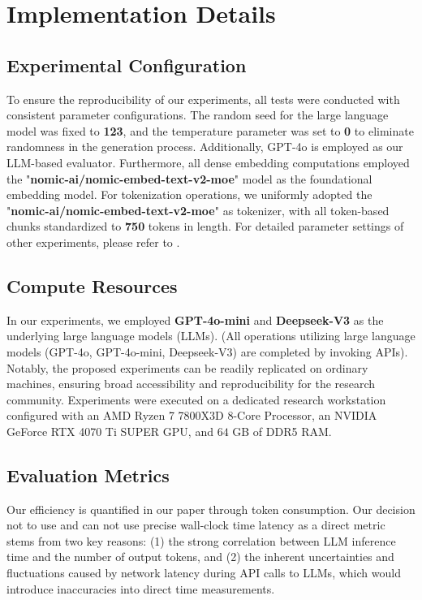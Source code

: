 \section{Implementation Details}
\label{appendix:implementation-details}


\subsection{Experimental Configuration}
\label{appendix:experiment-config}
To ensure the reproducibility of our experiments, all tests were conducted with consistent parameter configurations. The random seed for the large language model was fixed to \textbf{123}, and the temperature parameter was set to \textbf{0} to eliminate randomness in the generation process. Additionally, GPT-4o is employed as our LLM-based evaluator. Furthermore, all dense embedding computations employed the "\textbf{nomic-ai/nomic-embed-text-v2-moe}" model \cite{Chunk4} as the foundational embedding model. For tokenization operations, we uniformly adopted the "\textbf{nomic-ai/nomic-embed-text-v2-moe}" as tokenizer, with all token-based chunks standardized to \textbf{750} tokens in length. For detailed parameter settings of other experiments, please refer to .

\subsection{Compute Resources}
\label{appendix:compute-resources}
In our experiments, we employed \textbf{GPT-4o-mini} \cite{gpt-4o-mini} and \textbf{Deepseek-V3} \cite{deepseek-v3} as the underlying large language models (LLMs). (All operations utilizing large language models (GPT-4o, GPT-4o-mini, Deepseek-V3) are completed by invoking APIs). Notably, the proposed experiments can be readily replicated on ordinary machines, ensuring broad accessibility and reproducibility for the research community. Experiments were executed on a dedicated research workstation configured with an AMD Ryzen 7 7800X3D 8-Core Processor, an NVIDIA GeForce RTX 4070 Ti SUPER GPU, and \(64\) GB of DDR5 RAM. 

\subsection{Evaluation Metrics}
Our efficiency is quantified in our paper through token consumption. Our decision not to use and can not use precise wall-clock time latency as a direct metric stems from two key reasons: (1) the strong correlation between LLM inference time and the number of output tokens, and (2) the inherent uncertainties and fluctuations caused by network latency during API calls to LLMs, which would introduce inaccuracies into direct time measurements. 



